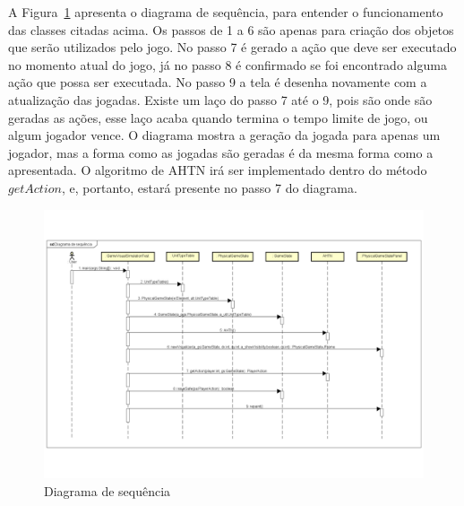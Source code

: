 A Figura~\ref{fig:sequencia} apresenta o diagrama de sequência, para entender o funcionamento das classes citadas acima. Os passos de 1 a 6 são apenas para criação dos objetos que serão utilizados pelo jogo. No passo 7 é gerado a ação que deve ser executado no momento atual do jogo, já no passo 8 é confirmado se foi encontrado alguma ação que possa ser executada. No passo 9 a tela é desenha novamente com a atualização das jogadas. Existe um laço do passo 7 até o 9, pois são onde são geradas as ações, esse laço acaba quando termina o tempo limite de jogo, ou algum jogador vence. O diagrama mostra a geração da jogada para apenas um jogador, mas a forma como as jogadas são geradas é da mesma forma como a apresentada. O algoritmo de AHTN irá ser implementado dentro do método $getAction$, e, portanto, estará presente no passo 7 do diagrama.

\begin{figure}[ht]
  	\centering
  	\includegraphics[width=1\textwidth]{fig/diagramaSequencia.pdf}
  	\caption{Diagrama de sequência}
  	\label{fig:sequencia}
\end{figure}


